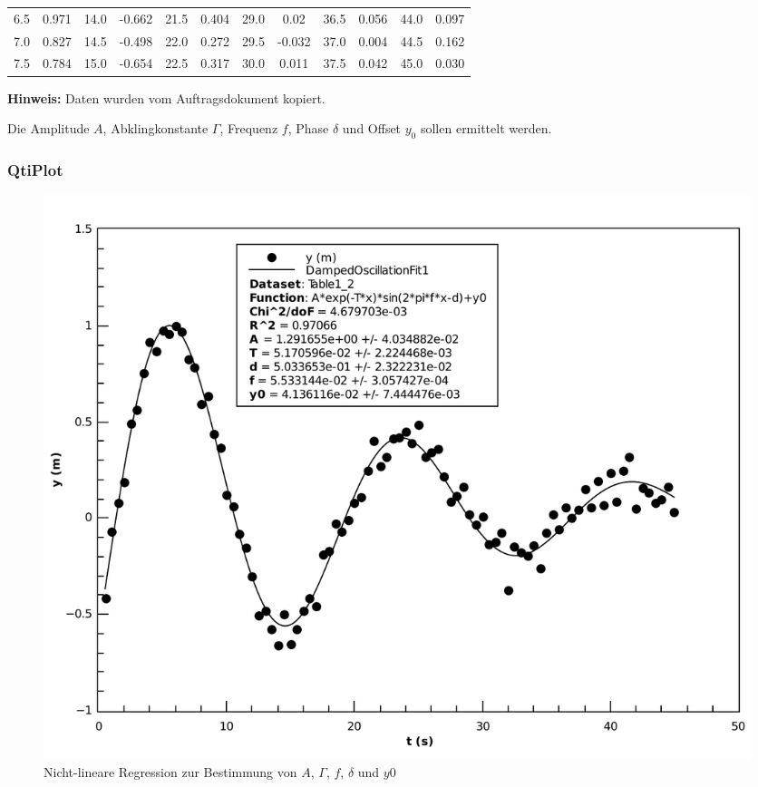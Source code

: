 \begin{center}
\begin{threeparttable}
\begin{tabular}{*{12}{c}}
            6.5     & 0.971     & 14.0      & -0.662    & 21.5     & 0.404      & 29.0      & 0.02      & 36.5      & 0.056     & 44.0      & 0.097   \\
            7.0     & 0.827     & 14.5      & -0.498    & 22.0     & 0.272      & 29.5      & -0.032    & 37.0      & 0.004     & 44.5      & 0.162   \\
            7.5     & 0.784     & 15.0      & -0.654    & 22.5     & 0.317      & 30.0      & 0.011     & 37.5      & 0.042     & 45.0      & 0.030   \\
            \bottomrule
        \end{tabular}
        \begin{tablenotes}
            \small
            \item \textbf{Hinweis:} Daten wurden vom Auftragsdokument kopiert.
        \end{tablenotes}
        \label{tab:pendel}
    \end{threeparttable}
\end{center}

Die Amplitude $A$, Abklingkonstante $\Gamma$, Frequenz $f$, Phase $\delta$ und Offset $y_0$ sollen
ermittelt werden.


\subsubsection*{QtiPlot}

\begin{figure}[H]
    \center
    \includegraphics[width=.85\textwidth]{qtiplot/pendel}
    \caption{Nicht-lineare Regression zur Bestimmung von $A$, $\Gamma$, $f$, $\delta$ und $y0$}
    \label{fig:pendel}
\end{figure}

